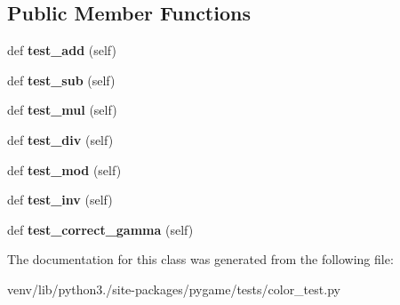 \subsection*{Public Member Functions}
\begin{DoxyCompactItemize}
\item 
\mbox{\label{classpygame_1_1tests_1_1color__test_1_1_subclass_test_a313bd935d8d6030ff649954ceccc3860}} 
def {\bfseries test\+\_\+add} (self)
\item 
\mbox{\label{classpygame_1_1tests_1_1color__test_1_1_subclass_test_a1929c131c673b01e2d0aef9d90b648b5}} 
def {\bfseries test\+\_\+sub} (self)
\item 
\mbox{\label{classpygame_1_1tests_1_1color__test_1_1_subclass_test_a977e9b6d96b034cb34e60e558de0aa25}} 
def {\bfseries test\+\_\+mul} (self)
\item 
\mbox{\label{classpygame_1_1tests_1_1color__test_1_1_subclass_test_a50ee4477699550b850f0767bb9094250}} 
def {\bfseries test\+\_\+div} (self)
\item 
\mbox{\label{classpygame_1_1tests_1_1color__test_1_1_subclass_test_adbc761bce9cd4db1657454f99813c482}} 
def {\bfseries test\+\_\+mod} (self)
\item 
\mbox{\label{classpygame_1_1tests_1_1color__test_1_1_subclass_test_a60e1275b2dd491c1177250b1f1a444b7}} 
def {\bfseries test\+\_\+inv} (self)
\item 
\mbox{\label{classpygame_1_1tests_1_1color__test_1_1_subclass_test_a93bbe5a6091862ed0d9eca03507764da}} 
def {\bfseries test\+\_\+correct\+\_\+gamma} (self)
\end{DoxyCompactItemize}


The documentation for this class was generated from the following file\+:\begin{DoxyCompactItemize}
\item 
venv/lib/python3./site-\/packages/pygame/tests/color\+\_\+test.\+py\end{DoxyCompactItemize}
